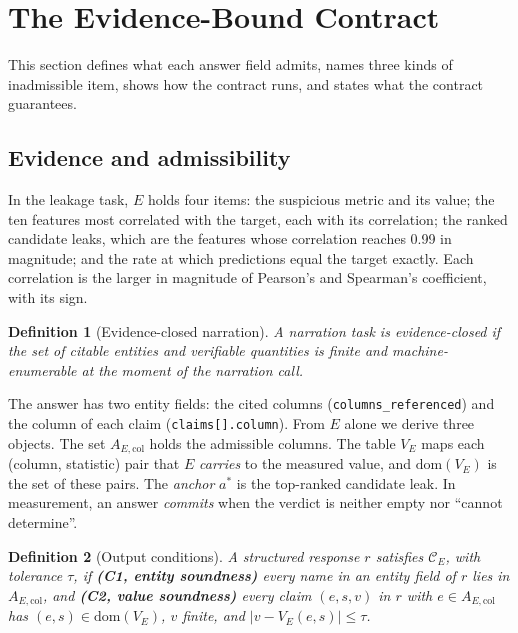 \documentclass[journal]{IEEEtran}
\newtheorem{definitionx}{Definition}
\begin{document}
\section{The Evidence-Bound Contract}\label{sec:contract}

This section defines what each answer field admits, names three kinds of
inadmissible item, shows how the contract runs, and states what the contract
guarantees.

\subsection{Evidence and admissibility}

In the leakage task, $E$ holds four items: the suspicious metric and its value;
the ten features most correlated with the target, each with its correlation; the
ranked candidate leaks, which are the features whose correlation reaches 0.99 in
magnitude; and the rate at which predictions equal the target exactly. Each
correlation is the larger in magnitude of Pearson's and Spearman's coefficient,
with its sign.

\begin{definitionx}[Evidence-closed narration]\label{def:closed}
A narration task is \emph{evidence-closed} if the set of citable entities and
verifiable quantities is finite and machine-enumerable at the moment of the
narration call.
\end{definitionx}

The answer has two entity fields: the cited columns
(\texttt{columns\_referenced}) and the column of each claim
(\texttt{claims[].column}). From $E$ alone we derive three objects. The set
$A_{E,\mathrm{col}}$ holds the admissible columns. The table $V_E$ maps each
(column, statistic) pair that $E$ \emph{carries} to the measured value, and
$\mathrm{dom}(V_E)$ is the set of these pairs. The \emph{anchor} $a^*$ is the
top-ranked candidate leak. In measurement, an answer \emph{commits} when the
verdict is neither empty nor ``cannot determine''.

\begin{definitionx}[Output conditions]\label{def:contract}
A structured response $r$ \emph{satisfies} $\mathcal{C}_E$, with tolerance
$\tau$, if \textbf{(C1, entity soundness)} every name in an entity field of $r$
lies in $A_{E,\mathrm{col}}$, and \textbf{(C2, value soundness)} every claim
$(e,s,v)$ in $r$ with $e \in A_{E,\mathrm{col}}$ has $(e,s) \in
\mathrm{dom}(V_E)$, $v$ finite, and $|v - V_E(e,s)| \le \tau$.
\end{definitionx}
\end{document}
